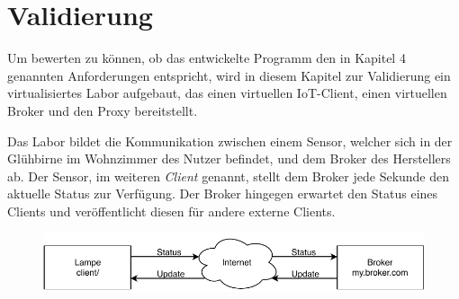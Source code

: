 \chapter{Validierung}
    
Um bewerten zu können, ob das entwickelte Programm den in Kapitel 4 genannten Anforderungen entspricht, wird in diesem Kapitel zur Validierung ein virtualisiertes Labor aufgebaut, das einen virtuellen \ac{IoT}-Client, einen virtuellen Broker und den Proxy bereitstellt.

Das Labor bildet die Kommunikation zwischen einem Sensor, welcher sich in der Glühbirne im Wohnzimmer des Nutzer befindet, und dem Broker des Herstellers ab. Der Sensor, im weiteren \emph{Client} genannt, stellt dem Broker jede Sekunde den aktuelle Status zur Verfügung. Der Broker hingegen erwartet den Status eines Clients und veröffentlicht diesen für andere externe Clients.

\begin{figure}[h]%
    \centering
    \includegraphics[width=14cm]{tex/bilder/6_validierung/Szenario.pdf}
    \label{fig:darstellung-szenario}
\end{figure}

